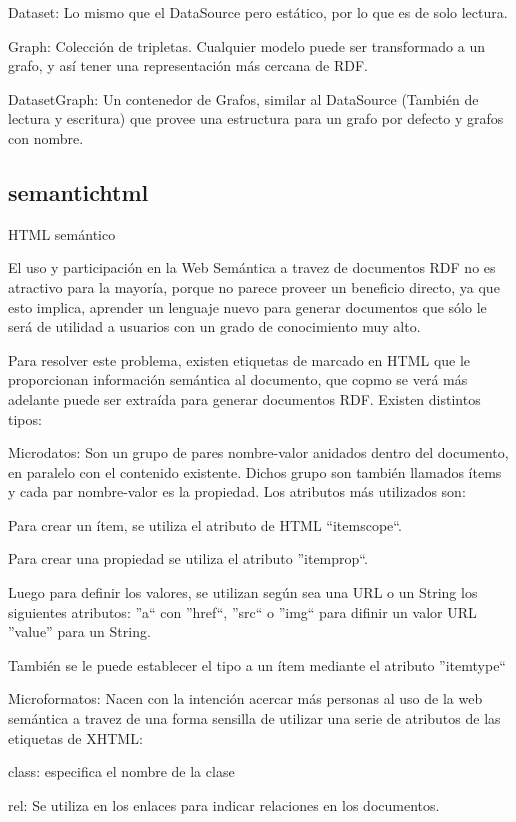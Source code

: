 Dataset: Lo mismo que el DataSource pero estático, por lo que es de solo lectura.

Graph: Colección de tripletas. Cualquier modelo puede ser transformado a un grafo, y así tener una representación más cercana de RDF.

DatasetGraph: Un contenedor de Grafos, similar al DataSource (También de lectura y escritura) que provee una estructura para un grafo por defecto y grafos con nombre.

\subsection{semantichtml}
HTML semántico

El uso y participación en la Web Semántica a travez de documentos RDF no es atractivo para la mayoría, porque no parece proveer un beneficio 
directo, ya que esto implica, aprender un lenguaje nuevo para generar documentos que sólo le será de utilidad a usuarios con un grado de conocimiento 
muy alto. 

Para resolver este problema, existen etiquetas de marcado en HTML que le proporcionan información semántica al documento, que copmo se verá más adelante 
puede ser extraída para generar documentos RDF. Existen distintos tipos:

Microdatos: Son un grupo de pares nombre-valor anidados dentro del documento, en paralelo con el contenido existente. Dichos grupo son 
también llamados ítems y cada par nombre-valor es la propiedad. Los atributos más utilizados son:

Para crear un ítem, se utiliza el atributo de HTML ``itemscope``. 

Para crear una propiedad se utiliza el atributo ''itemprop``.

Luego para definir los valores, se utilizan según sea una URL o un String los siguientes atributos:
''a`` con ''href``, ''src`` o ''img`` para difinir un valor URL
''value'' para un String.

También se le puede establecer el tipo a un ítem mediante el atributo ''itemtype``


Microformatos: Nacen con la intención acercar más personas al uso de la web semántica a travez de una forma sensilla de utilizar 
una serie de atributos de las etiquetas de XHTML:

class: especifica el nombre de la clase

rel: Se utiliza en los enlaces para indicar relaciones en los documentos.


